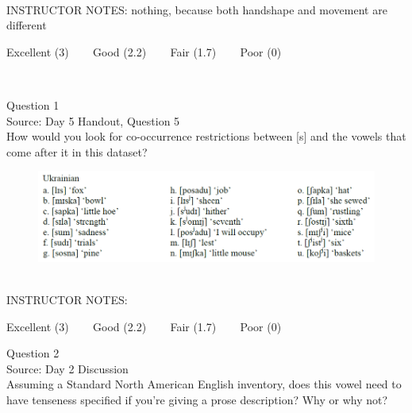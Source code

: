 \documentclass[12pt]{article}
\begin{document}
~\\
INSTRUCTOR NOTES: nothing, because both handshape and movement are different


\vfill
Excellent (3) ~~~ Good (2.2) ~~~ Fair (1.7) ~~~ Poor (0)
\newpage

\begin{center}
\textbf{{\color{red}{\HUGE END OF EXAM}}}\\

\end{center}
\newpage

\begin{center}
\textbf{{\color{blue}{\HUGE START OF EXAM\\}}}

\textbf{{\color{blue}{\HUGE Student ID: 1956\\}}}

\textbf{{\color{blue}{\HUGE 3:30 - 3:45 PM\\}}}

\end{center}
\newpage

{\large Question 1}\\

Source: Day 5 Handout, Question 5\\

How would you look for co-occurrence restrictions between [s] and the vowels that come after it in this dataset?\\

\begin{figure}[H]
\includegraphics{../images/ukrainian.png}
\end{figure}

~\\
INSTRUCTOR NOTES: 


\vfill
Excellent (3) ~~~ Good (2.2) ~~~ Fair (1.7) ~~~ Poor (0)
\newpage

{\large Question 2}\\

Source: Day 2 Discussion\\

Assuming a Standard North American English inventory, does this vowel need to have tenseness specified if you're giving a prose description? Why or why not?\\
\end{document}
